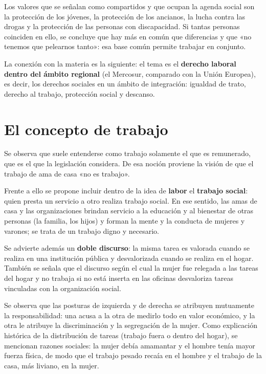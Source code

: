 \documentclass[12pt,oneside]{book}
\begin{document}
Los valores que se señalan como compartidos y que ocupan la agenda social son la protección de los jóvenes, la protección de los ancianos, la lucha contra las drogas y la protección de las personas con discapacidad. Si tantas personas coinciden en ello, se concluye que hay más en común que diferencias y que «no tenemos que pelearnos tanto»: esa base común permite trabajar en conjunto.

La conexión con la materia es la siguiente: el tema es el \textbf{derecho laboral dentro del ámbito regional} (el Mercosur, comparado con la Unión Europea), es decir, los derechos sociales en un ámbito de integración: igualdad de trato, derecho al trabajo, protección social y descanso.

\section{El concepto de trabajo}

Se observa que suele entenderse como trabajo solamente el que es remunerado, que es el que la legislación considera. De esa noción proviene la visión de que el trabajo de ama de casa «no es trabajo».

Frente a ello se propone incluir dentro de la idea de \textbf{labor} el \textbf{trabajo social}: quien presta un servicio a otro realiza trabajo social. En ese sentido, las amas de casa y las organizaciones brindan servicio a la educación y al bienestar de otras personas (la familia, los hijos) y forman la mente y la conducta de mujeres y varones; se trata de un trabajo digno y necesario.

Se advierte además un \textbf{doble discurso}: la misma tarea es valorada cuando se realiza en una institución pública y desvalorizada cuando se realiza en el hogar. También se señala que el discurso según el cual la mujer fue relegada a las tareas del hogar y no trabaja si no está inserta en las oficinas desvaloriza tareas vinculadas con la organización social.

Se observa que las posturas de izquierda y de derecha se atribuyen mutuamente la responsabilidad: una acusa a la otra de medirlo todo en valor económico, y la otra le atribuye la discriminación y la segregación de la mujer. Como explicación histórica de la distribución de tareas (trabajo fuera o dentro del hogar), se mencionan razones sociales: la mujer debía amamantar y el hombre tenía mayor fuerza física, de modo que el trabajo pesado recaía en el hombre y el trabajo de la casa, más liviano, en la mujer.
\end{document}

